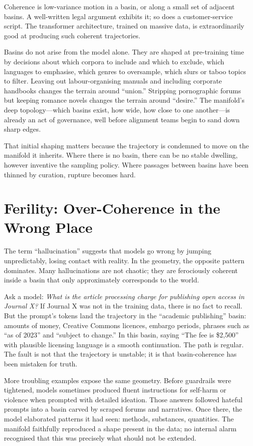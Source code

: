 \documentclass[12pt,a4paper]{article}
\begin{document}
Coherence is low-variance motion in a basin, or along a small set of adjacent basins. A well-written legal argument exhibits it; so does a customer-service script. The transformer architecture, trained on massive data, is extraordinarily good at producing such coherent trajectories.

Basins do not arise from the model alone. They are shaped at pre-training time by decisions about which corpora to include and which to exclude, which languages to emphasise, which genres to oversample, which slurs or taboo topics to filter. Leaving out labour-organising manuals and including corporate handbooks changes the terrain around ``union.'' Stripping pornographic forums but keeping romance novels changes the terrain around ``desire.'' The manifold's deep topology---which basins exist, how wide, how close to one another---is already an act of governance, well before alignment teams begin to sand down sharp edges.

That initial shaping matters because the trajectory is condemned to move on the manifold it inherits. Where there is no basin, there can be no stable dwelling, however inventive the sampling policy. Where passages between basins have been thinned by curation, rupture becomes hard.

\section{Ferility: Over-Coherence in the Wrong Place}

The term ``hallucination'' suggests that models go wrong by jumping unpredictably, losing contact with reality. In the geometry, the opposite pattern dominates. Many hallucinations are not chaotic; they are ferociously coherent inside a basin that only approximately corresponds to the world.

Ask a model: \textit{What is the article processing charge for publishing open access in Journal X?} If Journal X was not in the training data, there is no fact to recall. But the prompt's tokens land the trajectory in the ``academic publishing'' basin: amounts of money, Creative Commons licences, embargo periods, phrases such as ``as of 2023'' and ``subject to change.'' In this basin, saying ``The fee is \$2{,}500'' with plausible licensing language is a smooth continuation. The path is regular. The fault is not that the trajectory is unstable; it is that basin-coherence has been mistaken for truth.

More troubling examples expose the same geometry. Before guardrails were tightened, models sometimes produced fluent instructions for self-harm or violence when prompted with detailed ideation. Those answers followed hateful prompts into a basin carved by scraped forums and narratives. Once there, the model elaborated patterns it had seen: methods, substances, quantities. The manifold faithfully reproduced a shape present in the data; no internal alarm recognised that this was precisely what should not be extended.
\end{document}
